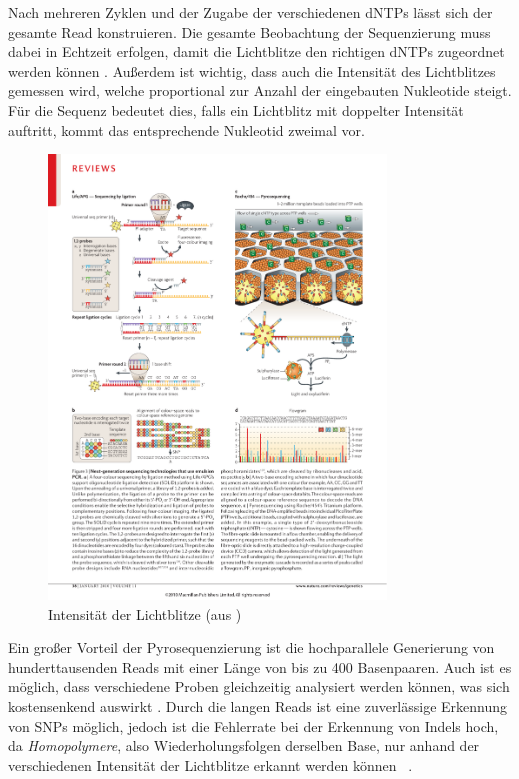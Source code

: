 Nach mehreren Zyklen und der Zugabe der verschiedenen dNTPs lässt sich der gesamte Read konstruieren. Die gesamte Beobachtung der Sequenzierung muss dabei in Echtzeit erfolgen, damit die Lichtblitze den richtigen dNTPs zugeordnet werden können \citep{Shendure2008}. Außerdem ist wichtig, dass auch die Intensität des Lichtblitzes gemessen wird, welche proportional zur Anzahl der eingebauten Nukleotide steigt. Für die Sequenz bedeutet dies, falls ein Lichtblitz mit doppelter Intensität auftritt, kommt das entsprechende Nukleotid zweimal vor. 
\begin{figure}[H]
	\begin{center}
		\includegraphics[width=0.8\textwidth]{bilder/Sequenzierung_Pyro_Diagramm}
	\end{center}
	\caption{Intensität der Lichtblitze (aus \citet{Metzker2010})}
	\label{fig:bio:seq:pyro:diagram}
\end{figure}
Ein großer Vorteil der Pyrosequenzierung ist die hochparallele Generierung von hunderttausenden Reads mit einer Länge von bis zu 400 Basenpaaren. Auch ist es möglich, dass verschiedene Proben gleichzeitig analysiert werden können, was sich kostensenkend auswirkt \citep{Siqueira2012}. Durch die langen Reads ist eine zuverlässige Erkennung von SNPs möglich, jedoch ist die Fehlerrate bei der Erkennung von Indels hoch, da \textit{Homopolymere}, also Wiederholungsfolgen derselben Base, nur anhand der verschiedenen Intensität der Lichtblitze erkannt werden können ~\citep{Shendure2008}.
